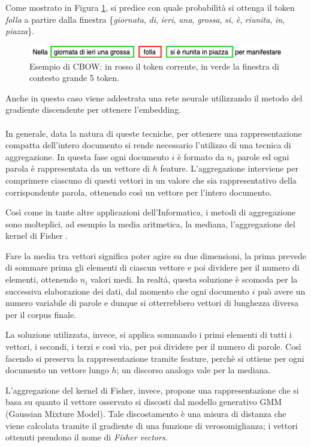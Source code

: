 \documentclass[12pt]{report}
\theoremstyle{definition}
\begin{document}
Come mostrato in Figura \ref{cbow}, si predice con quale probabilità si ottenga il token \textit{folla} a partire dalla finestra \{\textit{giornata}, \textit{di}, \textit{ieri}, \textit{una}, \textit{grossa}, \textit{si}, \textit{è}, \textit{riunita}, \textit{in}, \textit{piazza}\}.
\begin{figure}
    \centering
    \includegraphics[scale = 0.7]{images/cbow.png}
    \caption{Esempio di CBOW: in rosso il token corrente, in verde la finestra di contesto grande 5 token.}
    \label{cbow}
\end{figure}
Anche in questo caso viene addestrata una rete neurale utilizzando il metodo del gradiente discendente per ottenere l'embedding.
\\
\\
In generale, data la natura di queste tecniche, per ottenere una rappresentazione compatta dell'intero documento si rende necessario l'utilizzo di una tecnica di aggregazione.
In questa fase ogni documento $i$ è formato da $n_i$ parole ed ogni parola è rappresentata da un vettore di $h$ feature. L'aggregazione interviene per comprimere ciascuno di questi vettori in un valore che sia rappresentativo della corrispondente parola, ottenendo così un vettore per l'intero documento.

Così come in tante altre applicazioni dell'Informatica, i metodi di aggregazione sono molteplici, ad esempio la media aritmetica, la mediana, l'aggregazione del kernel di Fisher \cite{19}.

Fare la media tra vettori significa poter agire su due dimensioni, la prima prevede di sommare prima gli elementi di ciascun vettore e poi dividere per il numero di elementi, ottenendo $n_i$ valori medi. In realtà, questa soluzione è scomoda per la successiva elaborazione dei dati, dal momento che ogni documento $i$ può avere un numero variabile di parole e dunque si otterrebbero vettori di lunghezza diversa per il corpus finale.

La soluzione utilizzata, invece, si applica sommando i primi elementi di tutti i vettori, i secondi, i terzi e così via, per poi dividere per il numero di parole. Così facendo si preserva la rappresentazione tramite feature, perchè si ottiene per ogni documento un vettore lungo $h$; un discorso analogo vale per la mediana.

L'aggregazione del kernel di Fisher, invece, propone una rappresentazione che si basa su quanto il vettore osservato si discosti dal modello generativo GMM (Gaussian Mixture Model). Tale discostamento è una misura di distanza che viene calcolata tramite il gradiente di una funzione di verosomiglianza; i vettori ottenuti prendono il nome di \textit{Fisher vectors}.
\end{document}
